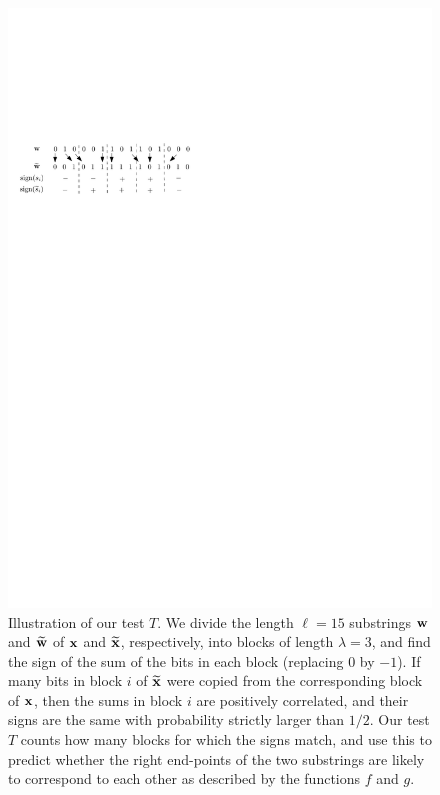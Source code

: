 \documentclass[final,12pt]{colt2018} %
\newcommand{\1}{\mathbf{1}}
\newcommand{\wt}{\widetilde}
\def\xt{{\wt {\bf x}}}
\def\x{{\bf x}}
\def\w{{\bf w}}
\begin{document}
\begin{figure}[ht]
	\centering
	\includegraphics[scale=1]{test}
	\caption{Illustration of our test $T$. We divide the length $\ell=15$ substrings $\w$ and $\wt{\w}$ of $\x$ and $\xt$, respectively, into blocks of length $\lambda=3$, and find the sign of the sum of the bits in each block (replacing 0 by $-1$). If many bits in block $i$ of $\xt$ were copied from the corresponding block of $\x$, then the sums in block $i$ are positively correlated, and their signs are the same with probability strictly larger than $1/2$. Our test $T$ counts how many blocks for which the signs match, and use this to predict whether the right end-points of the two substrings are likely to correspond to each other as described by the functions $f$ and $g$.
	}
\end{figure}
\end{document}
